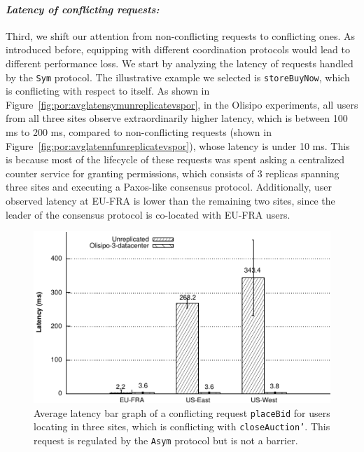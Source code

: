 \paragraph{{\em Latency of conflicting requests: }} Third, we shift our attention from non-conflicting requests
to conflicting ones. As introduced before, equipping with different coordination 
protocols would lead to different performance loss. We start by analyzing the latency of 
requests handled by the {\tt Sym} protocol. The illustrative example we selected 
is {\tt storeBuyNow}, which is conflicting with respect to itself. As shown in 
Figure~\ref{fig:por:avglatensymunreplicatevspor}, in the Olisipo experiments, all users 
from all three sites observe extraordinarily higher latency, which is between 100 ms to 200 ms, compared
to non-conflicting requests (shown in Figure~\ref{fig:por:avglatennfunreplicatevspor}), 
whose latency is under 10 ms. This is because most of the lifecycle of these
requests was spent asking a centralized counter service for granting permissions, which
consists of 3 replicas spanning three sites and executing a Paxos-like consensus protocol. 
Additionally, user observed latency at EU-FRA is lower than
the remaining two sites, since the leader of the consensus protocol is co-located
with EU-FRA users. 

\begin{figure}[t!]
  \centering
\includegraphics[width=0.85\columnwidth]{figures/eval/avg_latency_asym_placebid_unreplicated_vs_por.pdf}
  \caption{Average latency bar graph of a conflicting request {\tt placeBid} for
  users locating in three sites, which is conflicting with {\tt closeAuction'}. This request
  is regulated by the {\tt Asym} protocol but is not a barrier.}
 \label{fig:por:avglatenasymnbunreplicatevspor}
\end{figure}

